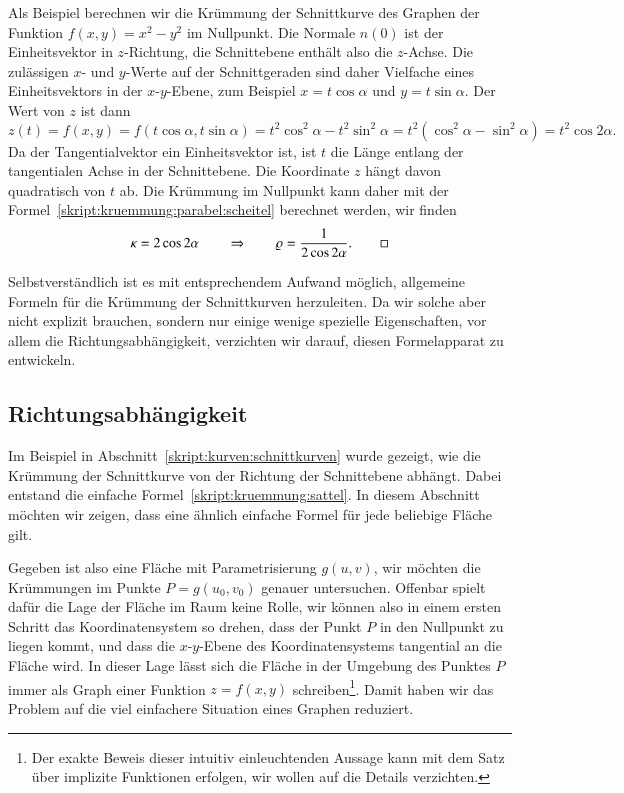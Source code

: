 \begin{beispiel}
\label{skript:sattelbeispiel}
Als Beispiel berechnen wir die Krümmung der Schnittkurve des Graphen
der Funktion
$f(x,y) = x^2-y^2$ im Nullpunkt.
Die Normale $n(0)$ ist der Einheitsvektor in $z$-Richtung, die Schnitt\-ebene
enthält also die $z$-Achse.
Die zulässigen $x$- und $y$-Werte auf der Schnittgeraden sind daher Vielfache
eines Einheitsvektors in der $x$-$y$-Ebene, zum Beispiel $x=t\cos\alpha$
und $y=t\sin\alpha$.
Der Wert von $z$ ist dann
\[
z(t)
=
f(x,y)
=
f(t\cos\alpha,t\sin\alpha)
=
t^2\cos^2\alpha - t^2\sin^2\alpha
=
t^2(\cos^2\alpha - \sin^2\alpha)
=
t^2\cos 2\alpha.
\]
Da der Tangentialvektor ein Einheitsvektor ist, ist $t$ die Länge entlang
der tangentialen Achse in der Schnittebene.
Die Koordinate $z$ hängt davon quadratisch von $t$ ab.
Die Krümmung im Nullpunkt kann daher mit der
Formel~\eqref{skript:kruemmung:parabel:scheitel}
berechnet werden, wir finden
\begin{equation}
\kappa = 2\cos2\alpha
\qquad\Rightarrow\qquad
\varrho = \frac1{2\cos2\alpha}.
\label{skript:kruemmung:sattel}
\qedhere
\end{equation}
\end{beispiel}

Selbstverständlich ist es mit entsprechendem Aufwand möglich, allgemeine
Formeln für die Krümmung der Schnittkurven herzuleiten.
Da wir solche aber nicht explizit brauchen, sondern nur einige wenige
spezielle Eigenschaften, vor allem die Richtungsabhängigkeit, verzichten
wir darauf, diesen Formelapparat zu entwickeln.

\subsection{Richtungsabhängigkeit%
\label{skript:kruemmung:richtungsabhaengigkeit}}
Im Beispiel in Abschnitt~\ref{skript:kurven:schnittkurven}
wurde gezeigt, wie die Krümmung der Schnittkurve von der Richtung
der Schnittebene abhängt.
Dabei entstand die einfache Formel~\eqref{skript:kruemmung:sattel}.
In diesem Abschnitt möchten wir zeigen, dass eine ähnlich einfache
Formel für jede beliebige Fläche gilt.

Gegeben ist also eine Fläche mit Parametrisierung $g(u,v)$, wir möchten
die Krümmungen im Punkte $P=g(u_0,v_0)$ genauer untersuchen.
Offenbar spielt dafür die Lage der Fläche im Raum keine Rolle, wir können
also in einem ersten Schritt das Koordinatensystem so drehen, dass der
Punkt $P$ in den Nullpunkt zu liegen kommt, und dass die $x$-$y$-Ebene des
Koordinatensystems tangential an die Fläche wird.
In dieser Lage lässt sich die Fläche in der Umgebung des Punktes $P$
immer als Graph einer Funktion
$z=f(x,y)$ schreiben\footnote{%
Der exakte Beweis dieser intuitiv einleuchtenden Aussage kann mit
dem Satz über implizite Funktionen erfolgen, wir wollen auf die Details
verzichten.}.
Damit haben wir das Problem auf die viel einfachere Situation eines
Graphen reduziert.

